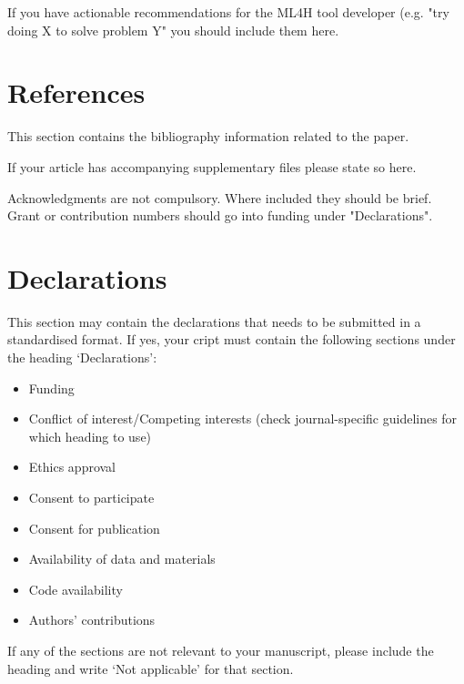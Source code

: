 \documentclass[ml4h-mathphys]{ml4h-jnl}%
\theoremstyle{thmstyleone}%
\theoremstyle{thmstyletwo}%
\theoremstyle{thmstylethree}%
\begin{document}
If you have actionable recommendations for the ML4H tool developer (e.g. "try doing X to solve problem Y" you should include them here.


\section{References}
This section contains the bibliography information related to the paper.

\backmatter


If your article has accompanying supplementary files please state so here. 


Acknowledgments are not compulsory. Where included they should be brief. Grant or contribution numbers should go into funding under "Declarations".

\section*{Declarations}
This section may contain the declarations that needs to be submitted in a standardised format. If yes, your cript must contain the following sections under the heading `Declarations':

\begin{itemize}
\item Funding
\item Conflict of interest/Competing interests (check journal-specific guidelines for which heading to use)
\item Ethics approval 
\item Consent to participate
\item Consent for publication
\item Availability of data and materials
\item Code availability 
\item Authors' contributions
\end{itemize}

\noindent
If any of the sections are not relevant to your manuscript, please include the heading and write `Not applicable' for that section. 


\end{document}
